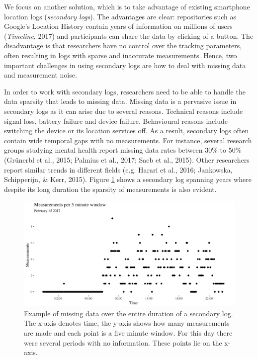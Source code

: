 \documentclass[man]{apa6}
\theoremstyle{definition}
\theoremstyle{definition}
\theoremstyle{definition}
\theoremstyle{remark}
\begin{document}
We focus on another solution, which is to take advantage of existing
smartphone location logs (\emph{secondary logs}). The advantages are
clear: repositories such as Google's Location History contain years of
information on millions of users (\emph{Timeline}, 2017) and
participants can share the data by clicking of a button. The
disadvantage is that researchers have no control over the tracking
parameters, often resulting in logs with sparse and inaccurate
measurements. Hence, two important challenges in using secondary logs
are how to deal with missing data and measurement noise.

In order to work with secondary logs, researchers need to be able to
handle the data sparsity that leads to missing data. Missing data is a
pervasive issue in secondary logs as it can arise due to several
reasons. Technical reasons include signal loss, battery failure and
device failure. Behavioural reasons include switching the device or its
location services off. As a result, secondary logs often contain wide
temporal gaps with no measurements. For instance, several research
groups studying mental health report missing data rates between 30\% to
50\% (Grünerbl et al., 2015; Palmius et al., 2017; Saeb et al., 2015).
Other researchers report similar trends in different fields (e.g. Harari
et al., 2016; Jankowska, Schipperijn, \& Kerr, 2015). Figure
\ref{fig:longMeasurementsPerDay} shows a secondary log spanning years
where despite its long duration the sparsity of measurements is also
evident.

\begin{figure}
\includegraphics[width=1\linewidth]{img/missin5minExample2018} \caption{Example of missing data over the entire duration of a secondary log. The x-axis denotes time, the y-axis shows how many measurements are made and each point is a five minute window. For this day there were several periods with no information. These points lie on the x-axis.}\label{fig:longMeasurementsPerDay}
\end{figure}
\end{document}
